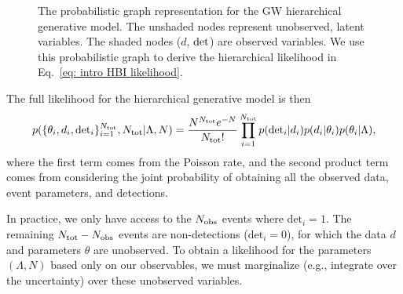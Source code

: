\begin{refsection}
\begin{figure}[htbp]
    \caption{The probabilistic graph representation for the \ac{GW} hierarchical generative model. The unshaded nodes represent unobserved, latent variables. The shaded nodes ($d$, ${\rm det}$) are observed variables. We use this probabilistic graph to derive the hierarchical likelihood in Eq.~\ref{eq: intro HBI likelihood}.}
    \label{fig: hierarchical Bayesian inference dag}
\end{figure}

The full likelihood for the hierarchical generative model is then
\begin{equation}
    p(\{\theta_i,d_i,{\rm det}_i\}_{i=1}^{N_{\rm tot}},N_{\rm tot}|\Lambda, N) = \frac{N^{N_{\rm tot}}e^{-N}}{N_{\rm tot}!}\prod_{i=1}^{N_{\rm tot}}p({\rm det}_i|d_i)p(d_i|\theta_i)p(\theta_i|\Lambda),
\end{equation}
where the first term comes from the Poisson rate, and the second product term comes from considering the joint probability of obtaining all the observed data, event parameters, and detections.

In practice, we only have access to the $N_{\rm obs}$ events where $\text{det}_i = 1$. The remaining $N_{\rm tot} - N_{\rm obs}$ events are non-detections ($\text{det}_i = 0$), for which the data $d$ and parameters $\theta$ are unobserved. To obtain a likelihood for the parameters $(\Lambda, N)$ based only on our observables, we must marginalize (e.g., integrate over the uncertainty) over these unobserved variables.


\end{refsection}
